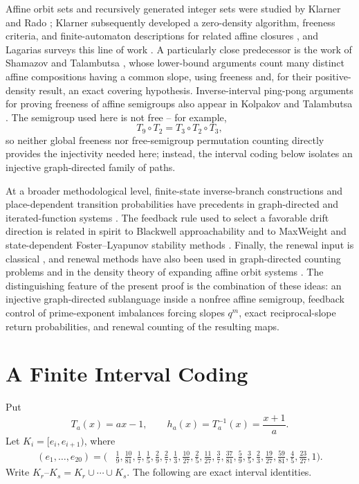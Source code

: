 \documentclass[11pt]{article}
\begin{document}
Affine orbit sets and recursively generated integer sets were studied by
Klarner and Rado \cite{KlarnerRado1974}; Klarner subsequently developed a
zero-density algorithm, freeness criteria, and finite-automaton descriptions
for related affine closures
\cite{Klarner1981,Klarner1982,Klarner1988}, and Lagarias surveys this line of
work \cite{Lagarias2016}. A particularly close predecessor is the work of
Shamazov and Talambutsa \cite{ShamazovTalambutsa2026}, whose lower-bound
arguments count many distinct affine compositions having a common slope,
using freeness and, for their positive-density result, an exact covering
hypothesis. Inverse-interval ping-pong arguments for proving freeness of
affine semigroups also appear in Kolpakov and Talambutsa
\cite{KolpakovTalambutsa2022}. The semigroup used here is not free -- for
example,
\[
T_9\circ T_2=T_3\circ T_2\circ T_3,
\]
so neither global freeness nor free-semigroup permutation counting directly
provides the injectivity needed here; instead, the interval coding below
isolates an injective graph-directed family of paths. 

At a broader
methodological level, finite-state inverse-branch constructions and
place-dependent transition probabilities have precedents in graph-directed
and iterated-function systems
\cite{MauldinWilliams1988,BarnsleyEtAl1988}. The feedback rule used to select
a favorable drift direction is related in spirit to Blackwell approachability
and to MaxWeight and state-dependent Foster--Lyapunov stability methods
\cite{Blackwell1956,TassiulasEphremides1992,YukselMeyn2013}. Finally, the
renewal input is classical \cite{Feller}, and renewal methods have also been
used in graph-directed counting problems and in the density theory of
expanding affine orbit systems \cite{HamblyNyberg2003,MiaoXu2026}. The
distinguishing feature of the present proof is the combination of these
ideas: an injective graph-directed sublanguage inside a nonfree affine
semigroup, feedback control of prime-exponent imbalances forcing slopes
$q^m$, exact reciprocal-slope return probabilities, and renewal counting of
the resulting maps.

\section{A Finite Interval Coding}

Put
\[
T_a(x)=ax-1,
\qquad
h_a(x)=T_a^{-1}(x)=\frac{x+1}{a}.
\]
Let $K_i=[e_i,e_{i+1})$, where
\[
\begin{aligned}
(e_1,\ldots,e_{20})=\biggl(
&\frac19,\frac{10}{81},\frac17,\frac15,\frac29,\frac27,
\frac13,\frac{10}{27},\frac25,\frac{11}{27},\frac37,\frac{37}{81},\frac59,\frac35,\frac23,
\frac{19}{27},\frac{59}{81},\frac45,\frac{23}{27},1
\biggr).
\end{aligned}
\]
Write $K_r\text{--}K_s=K_r\cup\cdots\cup K_s$. The following are exact interval identities.
\end{document}
